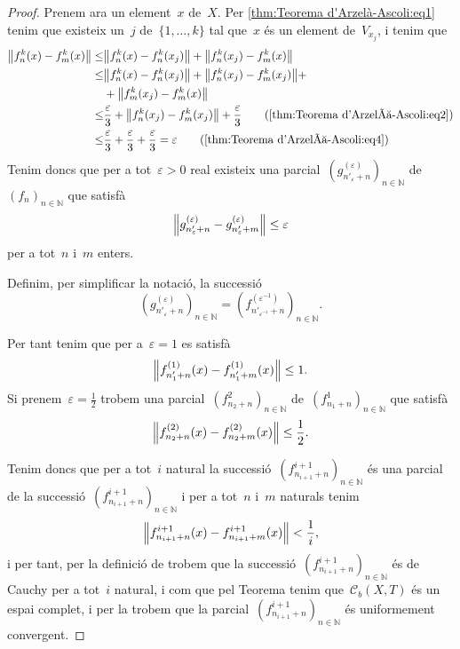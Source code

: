 \documentclass[../../main.tex]{subfiles}
\begin{document}
\begin{proof}
        Prenem ara un element~\(x\) de~\(X\).
        Per \eqref{thm:Teorema d'Arzelà-Ascoli:eq1} tenim que existeix un~\(j\) de~\(\{1,\dots,k\}\) tal que~\(x\) és un element de~\(V_{x_{j}}\), i tenim que
        \begin{align*}
            \norm{f^{k}_{n}(x)-f^{k}_{m}(x)}\leq&\norm{f^{k}_{n}(x)-f^{k}_{n}(x_{j})}+\norm{f^{k}_{n}(x_{j})-f^{k}_{m}(x)} \\
            \leq&\norm{f^{k}_{n}(x)-f^{k}_{n}(x_{j})}+\norm{f^{k}_{n}(x_{j})-f^{k}_{m}(x_{j})}+\\&+\norm{f^{k}_{m}(x_{j})-f^{k}_{m}(x)} \\
            \leq&\frac{\varepsilon}{3}+\norm{f^{k}_{n}(x_{j})-f^{k}_{m}(x_{j})}+\frac{\varepsilon}{3}\tag{\ref{thm:Teorema d'Arzelà-Ascoli:eq2}} \\
            \leq&\frac{\varepsilon}{3}+\frac{\varepsilon}{3}+\frac{\varepsilon}{3}=\varepsilon\tag{\ref{thm:Teorema d'Arzelà-Ascoli:eq4}}
        \end{align*}
        Tenim doncs que per a tot~\(\varepsilon>0\) real existeix una parcial~\((g^{(\varepsilon)}_{n'_{\varepsilon}+n})_{n\in\mathbb{N}}\) de~\((f_{n})_{n\in\mathbb{N}}\) que satisfà
        \[
            \norm{g^{(\varepsilon)}_{n'_{\varepsilon}+n}-g^{(\varepsilon)}_{n'_{\varepsilon}+m}}\leq\varepsilon
        \]
        per a tot~\(n\) i~\(m\) enters.

        Definim, per simplificar la notació, la successió
        \[
            \left(g^{(\varepsilon)}_{n'_{\varepsilon}+n}\right)_{n\in\mathbb{N}}=\left(f^{(\varepsilon^{-1})}_{n'_{\varepsilon^{-1}}+n}\right)_{n\in\mathbb{N}}.
        \]

        Per tant tenim que per a~\(\varepsilon=1\) es satisfà
        \[
            \norm{f^{(1)}_{n'_{1}+n}(x)-f^{(1)}_{n'_{1}+m}(x)}\leq1.
        \]
        Si prenem~\(\varepsilon=\frac{1}{2}\) trobem una parcial~\((f^{2}_{n_{2}+n})_{n\in\mathbb{N}}\) de~\((f^{1}_{n_{1}+n})_{n\in\mathbb{N}}\) que satisfà
        \[
            \norm{f^{(2)}_{n_{2}+n}(x)-f^{(2)}_{n_{2}+m}(x)}\leq\frac{1}{2}.
        \]

        Tenim doncs que per a tot~\(i\) natural la successió~\((f^{i+1}_{n_{i+1}+n})_{n\in\mathbb{N}}\) és una parcial de la successió~\((f^{i+1}_{n_{i+1}+n})_{n\in\mathbb{N}}\) i per a tot~\(n\) i~\(m\) naturals tenim
        \[
            \norm{f^{i+1}_{n_{i+1}+n}(x)-f^{i+1}_{n_{i+1}+m}(x)}<\frac{1}{i},
        \]
        i per tant, per la definició de  trobem que la successió~\((f^{i+1}_{n_{i+1}+n})_{n\in\mathbb{N}}\) és de Cauchy per a tot~\(i\) natural, i com que pel Teorema  tenim que~\(\mathcal{C}_{b}(X,T)\) és un espai complet, i per la  trobem que la parcial~\((f^{i+1}_{n_{i+1}+n})_{n\in\mathbb{N}}\) és uniformement convergent.
    \end{proof}
\end{document}
